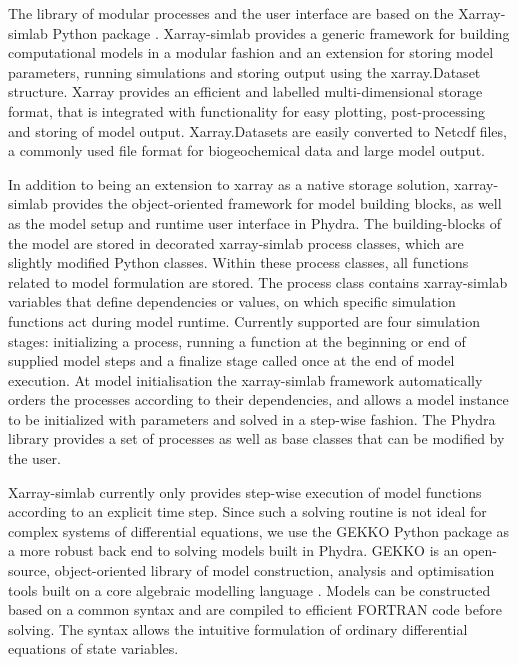 \documentclass[journal abbreviation, manuscript]{copernicus}
\begin{document}
The library of modular processes and the user interface are based on the Xarray-simlab Python package \citep{Bovy2018Xarray-simlab:Interactively}. Xarray-simlab provides a generic framework for building computational models in a modular fashion and an extension for storing model parameters, running simulations and storing output using the xarray.Dataset structure. Xarray provides an efficient and labelled multi-dimensional storage format, that is integrated with functionality for easy plotting, post-processing and storing of model output. Xarray.Datasets are easily converted to Netcdf files, a commonly used file format for biogeochemical data and large model output. 

In addition to being an extension to xarray as a native storage solution, xarray-simlab provides the object-oriented framework for model building blocks, as well as the model setup and runtime user interface in Phydra. The building-blocks of the model are stored in decorated xarray-simlab process classes, which are slightly modified Python classes. Within these process classes, all functions related to model formulation are stored. The process class contains xarray-simlab variables that define dependencies or values, on which specific simulation functions act during model runtime. Currently supported are four simulation stages: initializing a process, running a function at the beginning or end of supplied model steps and a finalize stage called once at the end of model execution. At model initialisation the xarray-simlab framework automatically orders the processes according to their dependencies, and allows a model instance to be initialized with parameters and solved in a step-wise fashion. The Phydra library provides a set of processes as well as base classes that can be modified by the user.

Xarray-simlab currently only provides step-wise execution of model functions according to an explicit time step. Since such a solving routine is not ideal for complex systems of differential equations, we use the GEKKO Python package as a more robust back end to solving models built in Phydra. GEKKO is an open-source, object-oriented library of model construction, analysis and optimisation tools built on a core algebraic modelling language \citep{Beal2018GEKKOSuite}. Models can be constructed based on a common syntax and are compiled to efficient FORTRAN code before solving. The syntax allows the intuitive formulation of ordinary differential equations of state variables.
\end{document}
